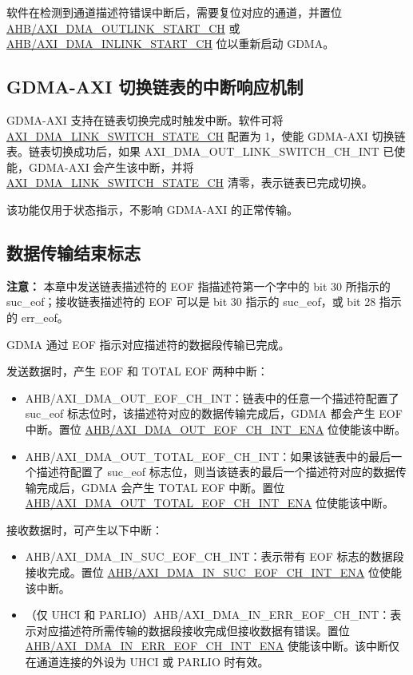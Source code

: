 \documentclass[main\_\_CN.tex]{subfiles}
\begin{document}
软件在检测到通道描述符错误中断后，需要复位对应的通道，并置位 \hyperref[fielddesc:AHBDMAOUTLINKSTARTCHN]{AHB/AXI\_DMA\_OUTLINK\_START\_CH} 或 \hyperref[fielddesc:AHBDMAINLINKSTARTCHN]{AHB/AXI\_DMA\_INLINK\_START\_CH} 位以重新启动 GDMA。


\subsection{GDMA-AXI 切换链表的中断响应机制}

GDMA-AXI 支持在链表切换完成时触发中断。软件可将 \hyperref[fielddesc:AXIDMALINKSWITCHSTATECHN]{AXI\_DMA\_LINK\_SWITCH\_STATE\_CH} 配置为 1，使能 GDMA-AXI 切换链表。链表切换成功后，如果 AXI\_DMA\_OUT\_LINK\_SWITCH\_CH\_INT 已使能，GDMA-AXI 会产生该中断，并将 \hyperref[fielddesc:AXIDMALINKSWITCHSTATECHN]{AXI\_DMA\_LINK\_SWITCH\_STATE\_CH} 清零，表示链表已完成切换。

该功能仅用于状态指示，不影响 GDMA-AXI 的正常传输。

\subsection{数据传输结束标志}

{\bfseries 注意：} 本章中发送链表描述符的 EOF 指描述符第一个字中的 bit 30 所指示的 suc\_eof；接收链表描述符的 EOF 可以是 bit 30 指示的 suc\_eof，或 bit 28 指示的 err\_eof。

GDMA 通过 EOF 指示对应描述符的数据段传输已完成。

发送数据时，产生 EOF 和 TOTAL EOF 两种中断：
\begin{itemize}
    \item AHB/AXI\_DMA\_OUT\_EOF\_CH\_INT：链表中的任意一个描述符配置了 suc\_eof 标志位时，该描述符对应的数据传输完成后，GDMA 都会产生 EOF 中断。置位 \hyperref[fielddesc:AHBDMAOUTEOFCHNINTENA]{AHB/AXI\_DMA\_OUT\_EOF\_CH\_INT\_ENA} 位使能该中断。
    \item AHB/AXI\_DMA\_OUT\_TOTAL\_EOF\_CH\_INT：如果该链表中的最后一个描述符配置了 suc\_eof 标志位，则当该链表的最后一个描述符对应的数据传输完成后，GDMA 会产生 TOTAL EOF 中断。置位 \hyperref[fielddesc:AHBDMAOUTTOTALEOFCHNINTENA]{AHB/AXI\_DMA\_OUT\_TOTAL\_EOF\_CH\_INT\_ENA} 位使能该中断。
\end{itemize}


接收数据时，可产生以下中断：
\begin{itemize}
    \item AHB/AXI\_DMA\_IN\_SUC\_EOF\_CH\_INT：表示带有 EOF 标志的数据段接收完成。置位 \hyperref[fielddesc:AHBDMAINSUCEOFCHNINTENA]{AHB/AXI\_DMA\_IN\_SUC\_EOF\_CH\_INT\_ENA} 位使能该中断。
    \item（仅 UHCI 和 PARLIO）AHB/AXI\_DMA\_IN\_ERR\_EOF\_CH\_INT：表示对应描述符所需传输的数据段接收完成但接收数据有错误。置位 \hyperref[fielddesc:AHBDMAINERREOFCHNINTENA]{AHB/AXI\_DMA\_IN\_ERR\_EOF\_CH\_INT\_ENA} 使能该中断。该中断仅在通道连接的外设为 UHCI 或 PARLIO 时有效。
\end{itemize}
\end{document}
